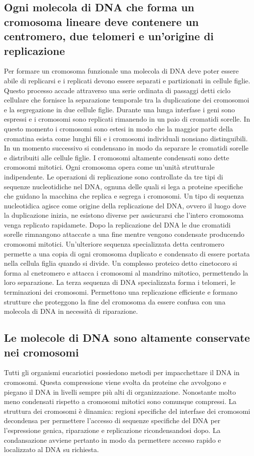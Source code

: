 \subsection{Ogni molecola di DNA che forma un cromosoma lineare deve contenere un centromero, due telomeri e un'origine di replicazione}
Per formare un cromosoma funzionale una molecola di DNA deve poter essere abile di replicarsi e i replicati devono essere separati e partizionati in cellule figlie. Questo processo 
accade attraverso una serie ordinata di passaggi detti ciclo cellulare che fornisce la separazione temporale tra la duplicazione dei cromosomoi e la segregazione in due cellule figlie. 
Durante una lunga interfase i geni sono espressi e i cromosomi sono replicati rimanendo in un paio di cromatidi sorelle. In questo momento i cromosomi sono estesi in modo che la maggior
parte della cromatina esista come lunghi fili e i cromosomi individuali nonsiano distinguibili. In un momento successivo si condensano in modo da separare le cromatidi sorelle e 
distribuiti alle cellule figlie. I cromosomi altamente condensati sono dette cromosomi mitotici. Ogni cromosoma opera come un'unit\`a strutturale indipendente. Le operazioni di 
replicazione sono controllate da tre tipi di sequenze nucleotidiche nel DNA, ognuna delle quali si lega a proteine specifiche che guidano la macchina che replica e segrega i cromosomi.
Un tipo di sequenza nucleotidica agisce come origine della replicazione del DNA, ovvero il luogo dove la duplicazione inizia, ne esistono diverse per assicurarsi che l'intero cromosoma
venga replicato rapidamete. Dopo la replicazione del DNA le due cromatidi sorelle rimnangono attaccate a una fine mentre vengono condensate producendo cromosomi mitotici. Un'ulteriore
sequenza specializzata detta centromero permette a una copia di ogni cromosoma duplicato e condensato di essere portata nella cellula figlia quando si divide. Un complesso proteico detto
cinetocoro si forma al cnetromero e attacca i cromosomi al mandrino mitotico, permettendo la loro separazione. La terza sequenza di DNA specializzata forma i telomeri, le terminazioni 
dei cromosomi. Permettono una replicazione efficiente e formano strutture che proteggono la fine del cromosoma da essere confusa con una molecola di DNA in necessit\`a di riparazione.
\subsection{Le molecole di DNA sono altamente conservate nei cromosomi}
Tutti gli organismi eucariotici possiedono metodi per impacchettare il DNA in cromosomi. Questa compressione viene svolta da proteine che avvolgono e piegano il DNA in livelli sempre 
pi\`u alti di organizzazione. Nonostante molto meno condensati rispetto a cromosomi mitotici sono comunque compressi. La struttura dei cromosomi \`e dinamica: regioni specifiche del
interfase dei cromosomi decondensa per permettere l'accesso di sequenze specifiche del DNA per l'espressione genica, riparazione e replicazione ricondensandosi dopo. La condansazione 
avviene pertanto in modo da permettere accesso rapido e localizzato al DNA su richiesta.
